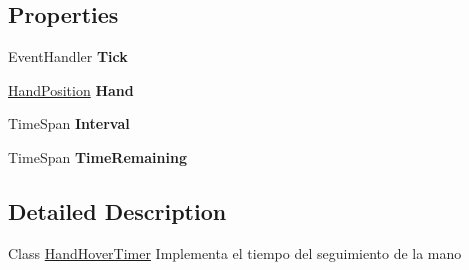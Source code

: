 \subsection*{Properties}
\begin{DoxyCompactItemize}
\item 
\hypertarget{class_microsoft_1_1_samples_1_1_kinect_1_1_basic_interactions_1_1_hand_hover_timer_ad6545afeff982c4c4a9283a0d38f5184}{Event\-Handler {\bfseries Tick}}\label{class_microsoft_1_1_samples_1_1_kinect_1_1_basic_interactions_1_1_hand_hover_timer_ad6545afeff982c4c4a9283a0d38f5184}

\item 
\hypertarget{class_microsoft_1_1_samples_1_1_kinect_1_1_basic_interactions_1_1_hand_hover_timer_a8592fa91d390f997a68ea1c557474dee}{\hyperlink{class_microsoft_1_1_samples_1_1_kinect_1_1_basic_interactions_1_1_hand_position}{Hand\-Position} {\bfseries Hand}}\label{class_microsoft_1_1_samples_1_1_kinect_1_1_basic_interactions_1_1_hand_hover_timer_a8592fa91d390f997a68ea1c557474dee}

\item 
\hypertarget{class_microsoft_1_1_samples_1_1_kinect_1_1_basic_interactions_1_1_hand_hover_timer_a21ddf77f6105da526dc2f89ec07ecd65}{Time\-Span {\bfseries Interval}}\label{class_microsoft_1_1_samples_1_1_kinect_1_1_basic_interactions_1_1_hand_hover_timer_a21ddf77f6105da526dc2f89ec07ecd65}

\item 
\hypertarget{class_microsoft_1_1_samples_1_1_kinect_1_1_basic_interactions_1_1_hand_hover_timer_a4cc2ca77099dd82e61eab6616bbbf524}{Time\-Span {\bfseries Time\-Remaining}}\label{class_microsoft_1_1_samples_1_1_kinect_1_1_basic_interactions_1_1_hand_hover_timer_a4cc2ca77099dd82e61eab6616bbbf524}

\end{DoxyCompactItemize}


\subsection{Detailed Description}
Class \hyperlink{class_microsoft_1_1_samples_1_1_kinect_1_1_basic_interactions_1_1_hand_hover_timer}{Hand\-Hover\-Timer} Implementa el tiempo del seguimiento de la mano 

